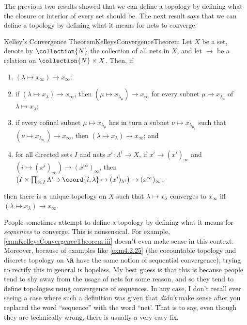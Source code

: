 The previous two results showed that we can define a topology by defining what the closure or interior of every set should be.  The next result says that we can define a topology by defining what it means for nets to converge.
\begin{thm}{Kelley's Convergence Theorem}{KelleysConvergenceTheorem}
Let $X$ be a set, denote by $\collection{N}$ the collection of all nets in $X$, and let $\to$ be a relation on $\collection{N}\times X$.  Then, if
\begin{enumerate}
\item \label{enmKelleysConvergenceTheorem.i}$(\lambda \mapsto x_\infty)\to x_\infty$;
\item \label{enmKelleysConvergenceTheorem.iix}if $(\lambda \mapsto x_{\lambda})\to x_{\infty}$, then $(\mu \mapsto x_{\lambda _{\mu}})\to x_{\infty}$ for every subnet $\mu \mapsto x_{\lambda _{\mu}}$ of $\lambda \mapsto x_{\lambda}$;
\item \label{enmKelleysConvergenceTheorem.ii}if every cofinal subnet $\mu \mapsto x_{\lambda _\mu}$ has in turn a subnet $\nu \mapsto x_{\lambda _{\mu _\nu}}$ such that $(\nu \mapsto x_{\lambda _{\mu _\nu}})\to x_\infty$, then $(\lambda \mapsto x_{\lambda})\to x_{\infty}$; and
\item \label{enmKelleysConvergenceTheorem.iii} for all directed sets $I$ and nets $x^i:\Lambda ^i\rightarrow X$, if $x^i\to (x^i)_\infty$ and $(i\mapsto (x^i)_\infty )\to (x^\infty )_\infty$, then $\left( I\times \prod _{i\in I}\Lambda ^i\ni \coord{i,\lambda}\mapsto (x^i)_{\lambda ^i}\right) \to (x^\infty )_\infty$,
\end{enumerate}
then there is a unique topology on $X$ such that $\lambda \mapsto x_\lambda$ converges to $x_\infty$ iff $(\lambda \mapsto x_\lambda )\to x_\infty$.
\begin{rmk}
People sometimes attempt to define a topology by defining what it means for \emph{sequences} to converge.  This is nonsensical.  For example, \cref{enmKelleysConvergenceTheorem.iii} doesn't even make sense in this context.  Moreover, because of examples like \cref{exm4.2.25} (the cocountable topology and discrete topology on $\R$ have the same notion of sequential convergence), trying to rectify this in general is hopeless.  My best guess is that this is because people tend to shy away from the usage of nets for some reason, and so they tend to define topologies using convergence of sequences.  In any case, I don't recall ever seeing a case where such a definition was given that \emph{didn't} make sense after you replaced the word ``sequence'' with the word ``net'.  That is to say, even though they are technically wrong, there is usually a very easy fix.

\end{rmk}
\end{thm}
